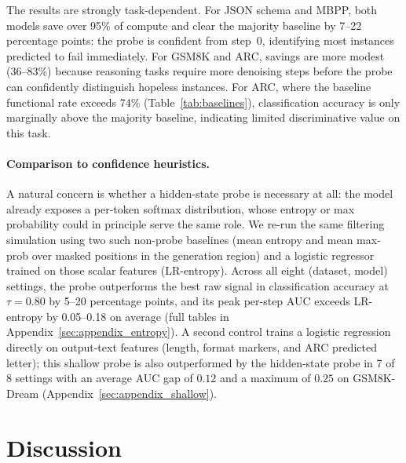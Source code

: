 \documentclass[11pt]{article}
\begin{document}
The results are strongly task-dependent.
For JSON schema and MBPP, both models save over 95\% of compute and clear the majority baseline by 7--22 percentage points: the probe is confident from step~0, identifying most instances predicted to fail immediately.
For GSM8K and ARC, savings are more modest (36--83\%) because reasoning tasks require more denoising steps before the probe can confidently distinguish hopeless instances.
For ARC, where the baseline functional rate exceeds 74\% (Table~\ref{tab:baselines}), classification accuracy is only marginally above the majority baseline, indicating limited discriminative value on this task.

\paragraph{Comparison to confidence heuristics.}
A natural concern is whether a hidden-state probe is necessary at all: the model already exposes a per-token softmax distribution, whose entropy or max probability could in principle serve the same role.
We re-run the same filtering simulation using two such non-probe baselines (mean entropy and mean max-prob over masked positions in the generation region) and a logistic regressor trained on those scalar features (LR-entropy).
Across all eight (dataset, model) settings, the probe outperforms the best raw signal in classification accuracy at $\tau = 0.80$ by 5--20 percentage points, and its peak per-step AUC exceeds LR-entropy by 0.05--0.18 on average (full tables in Appendix~\ref{sec:appendix_entropy}).
A second control trains a logistic regression directly on output-text features (length, format markers, and ARC predicted letter); this shallow probe is also outperformed by the hidden-state probe in 7 of 8 settings with an average AUC gap of $0.12$ and a maximum of $0.25$ on \mbox{GSM8K-Dream} (Appendix~\ref{sec:appendix_shallow}).

\section{Discussion}
\end{document}
